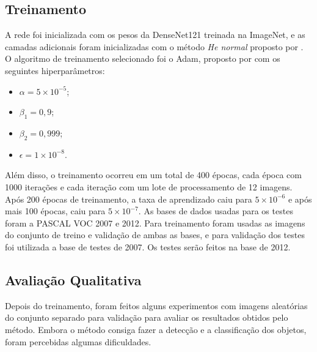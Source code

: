 \subsection{Treinamento}
\label{secao:5:1:1}

A rede foi inicializada com os pesos da \ac{DenseNet}121 treinada na ImageNet, e as camadas adicionais foram inicializadas com o método \textit{He normal} proposto por . O algoritmo de treinamento selecionado foi o Adam, proposto por  com os seguintes hiperparâmetros:

\begin{itemize}
	\item $\alpha = 5\times10^{-5}$;
	\item $\beta_1 = 0,9$;
	\item $\beta_2 = 0,999$;
	\item $\epsilon = 1\times10^{-8}$.
\end{itemize}

Além disso, o treinamento ocorreu em um total de 400 épocas, cada época com 1000 iterações e cada iteração com um lote de processamento de 12 imagens. Após 200 épocas de treinamento, a taxa de aprendizado caiu para $5\times10^{-6}$ e após mais 100 épocas, caiu para $5\times10^{-7}$. As bases de dados usadas para os testes foram a \ac{PASCAL VOC} 2007 e 2012. Para treinamento foram usadas as imagens do conjunto de treino e validação de ambas as bases, e para validação dos testes foi utilizada a base de testes de 2007. Os testes serão feitos na base de 2012.

\subsection{Avaliação Qualitativa}
\label{secao:5:1:2}

Depois do treinamento, foram feitos alguns experimentos com imagens aleatórias do conjunto separado para validação para avaliar os resultados obtidos pelo método. Embora o método consiga fazer a detecção e a classificação dos objetos, foram percebidas algumas dificuldades.

